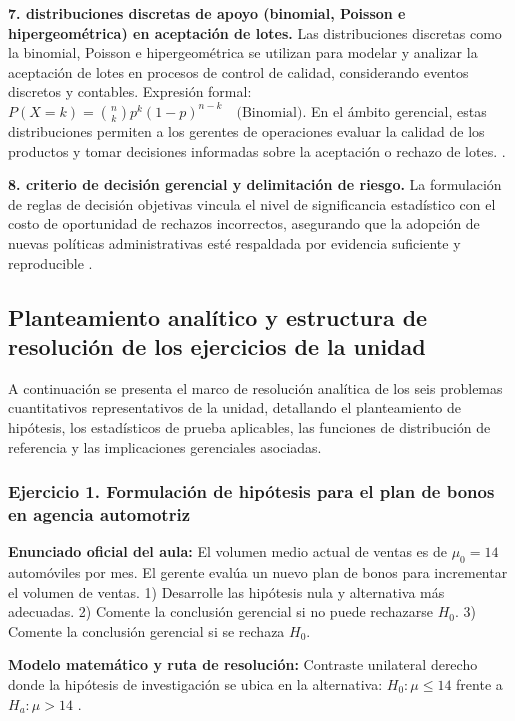 {\textbf{7. distribuciones discretas de apoyo (binomial, Poisson e hipergeométrica) en aceptación de lotes.} Las distribuciones discretas como la binomial, Poisson e hipergeométrica se utilizan para modelar y analizar la aceptación de lotes en procesos de control de calidad, considerando eventos discretos y contables. Expresión formal: $P(X = k) = \binom{n}{k} p^k (1-p)^{n-k} \quad \text{(Binomial)}$. En el ámbito gerencial, estas distribuciones permiten a los gerentes de operaciones evaluar la calidad de los productos y tomar decisiones informadas sobre la aceptación o rechazo de lotes. \citep{anderson2012,lind2012,wackerly2010}.

\textbf{8. criterio de decisión gerencial y delimitación de riesgo.} La formulación de reglas de decisión objetivas vincula el nivel de significancia estadístico con el costo de oportunidad de rechazos incorrectos, asegurando que la adopción de nuevas políticas administrativas esté respaldada por evidencia suficiente y reproducible \citep{anderson2012,lind2012,wackerly2010}.


\subsection{Planteamiento analítico y estructura de resolución de los ejercicios de la unidad}
A continuación se presenta el marco de resolución analítica de los seis problemas cuantitativos representativos de la unidad, detallando el planteamiento de hipótesis, los estadísticos de prueba aplicables, las funciones de distribución de referencia y las implicaciones gerenciales asociadas.

\subsubsection*{Ejercicio 1. Formulación de hipótesis para el plan de bonos en agencia automotriz}
\textbf{Enunciado oficial del aula:} El volumen medio actual de ventas es de $\mu_0 = 14$ automóviles por mes. El gerente evalúa un nuevo plan de bonos para incrementar el volumen de ventas. 1) Desarrolle las hipótesis nula y alternativa más adecuadas. 2) Comente la conclusión gerencial si no puede rechazarse $H_0$. 3) Comente la conclusión gerencial si se rechaza $H_0$.

\textbf{Modelo matemático y ruta de resolución:} Contraste unilateral derecho donde la hipótesis de investigación se ubica en la alternativa: $H_0: \mu \le 14$ frente a $H_a: \mu > 14$ \citep{anderson2012}.

}
